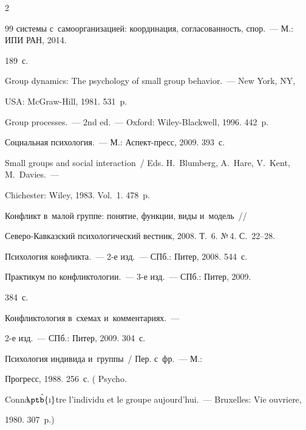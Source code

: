 \begin{multicols}{2}
{{\begin{thebibliography}{99}
системы с~самоорганизацией: координация, согласованность, спор.~--- М.: ИПИ РАН, 2014. 

189~с.




 Group dynamics: The psychology of small group behavior.~--- New York, NY, 

USA: McGraw-Hill, 1981. 531~p.


 Group processes.~--- 2nd ed.~--- Oxford: Wiley-Blackwell, 1996. 442~p.


 Социальная психология.~--- М.: Аспект-пресс, 2009. 393~с.


Small groups and social interaction~/ Eds. H.~Blumberg, A.~Hare, V.~Kent, M.~Davies.~--- 

Chichester: Wiley, 1983. Vol.~1. 478~p.


 Конфликт в~малой группе: понятие, функции, виды и~модель~//  

Се\-ве\-ро-Кав\-каз\-ский психологический вестник, 2008. Т.~6. №\,4. С.~22--28.


 Психология конфликта.~--- 2-е изд.~--- СПб.: Питер, 2008. 544~с.


 Практикум по конфликтологии.~--- 3-е изд.~--- СПб.: Питер, 2009. 

384~с.


 Конфликтология в~схемах и~комментариях.~--- 

2-е изд.~--- СПб.: Питер, 2009. 304~с.


 Психология индивида и~группы~/ Пер. с~фр.~--- М.: 

Прогресс, 1988. 256~с. ( Psycho. 

Conna$\hat{\mbox{\!\normalsize\!\ptb{\i}}}$tre l'individu et le groupe aujourd'hui.~--- Bruxelles: Vie ouvriere, 

1980. 307~p.)




\end{thebibliography}}}
\end{multicols}
